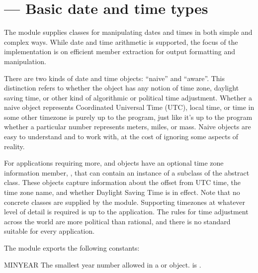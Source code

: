 
\section{ ---
         Basic date and time types}




The  module supplies classes for manipulating dates
and times in both simple and complex ways.  While date and time
arithmetic is supported, the focus of the implementation is on
efficient member extraction for output formatting and manipulation.

There are two kinds of date and time objects: ``naive'' and ``aware''.
This distinction refers to whether the object has any notion of time
zone, daylight saving time, or other kind of algorithmic or political
time adjustment.  Whether a naive  object represents
Coordinated Universal Time (UTC), local time, or time in some other
timezone is purely up to the program, just like it's up to the program
whether a particular number represents meters, miles, or mass.  Naive
 objects are easy to understand and to work with, at
the cost of ignoring some aspects of reality.

For applications requiring more,  and 
objects have an optional time zone information member,
, that can contain an instance of a subclass of
the abstract  class.  These  objects
capture information about the offset from UTC time, the time zone
name, and whether Daylight Saving Time is in effect.  Note that no
concrete  classes are supplied by the 
module.  Supporting timezones at whatever level of detail is required
is up to the application.  The rules for time adjustment across the
world are more political than rational, and there is no standard
suitable for every application.

The  module exports the following constants:

\begin{datadesc}{MINYEAR}
  The smallest year number allowed in a  or
   object.  
  is .
\end{datadesc}

